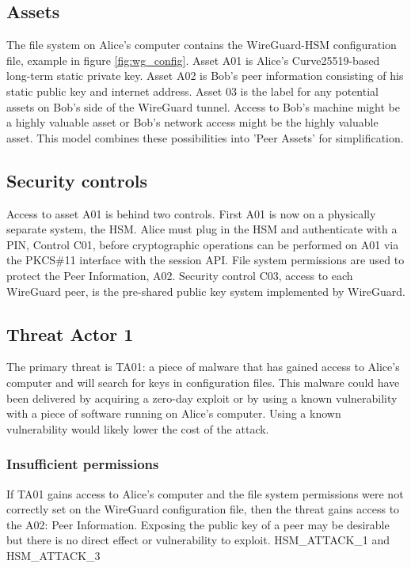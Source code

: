 \documentclass [11pt, proquest] {uwthesis}[2020/02/24]
\begin{document}
\subsection{Assets}
The file system on Alice's computer contains the WireGuard-HSM configuration file, example in figure \ref{fig:wg_config}. 
Asset A01 is Alice's Curve25519-based long-term static private key. Asset A02 is Bob's peer information consisting of his static public key and internet address.
Asset 03 is the label for any potential assets on Bob's side of the WireGuard tunnel. Access to Bob's machine might be a highly valuable asset or Bob's network access might be the highly valuable asset. This model combines these possibilities into 'Peer Assets' for simplification.

\subsection{Security controls}
Access to asset A01 is behind two controls. First A01 is now on a physically separate system, the HSM. Alice must plug in the HSM and authenticate with a PIN, Control C01, before cryptographic operations can be performed on A01 via the PKCS\#11 interface with the session API.
File system permissions are used to protect the Peer Information, A02.
Security control C03, access to each WireGuard peer, is the pre-shared public key system implemented by WireGuard.

\subsection{Threat Actor 1}
The primary threat is TA01: a piece of malware that has gained access to Alice's computer and will search for keys in configuration files. This malware could have been delivered by acquiring a zero-day exploit or by using a known vulnerability with a piece of software running on Alice's computer. Using a known vulnerability would likely lower the cost of the attack.

\subsubsection{Insufficient permissions}
If TA01 gains access to Alice's computer and the file system permissions were not correctly set on the WireGuard configuration file, then the threat gains access to the A02: Peer Information. Exposing the public key of a peer may be desirable but there is no direct effect or vulnerability to exploit.
HSM_ATTACK_1 and HSM_ATTACK_3
\end{document}
